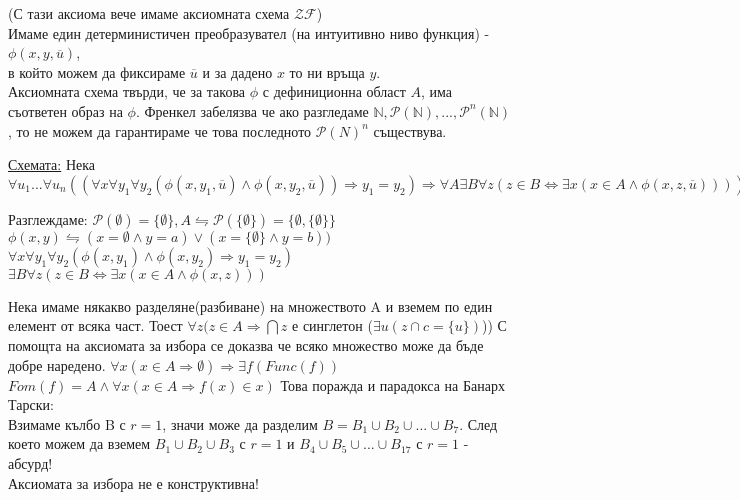 \documentclass[fleqn, titlepage, 12pt]{report}
\begin{document}
 (С тази аксиома вече имаме аксиомната схема $ \mathcal{ZF} $) \\
Имаме един детерминистичен преобразувател (на интуитивно ниво функция) - $ \phi(x,y,\overline{u})$,\\
в който можем да фиксираме $\overline{u}$ и за дадено $ x $ то ни връща $ y $.\\
Аксиомната схема твърди, че за такова $\phi$ с дефиниционна област $ A $, има съответен образ на $\phi$.
Френкел забелязва че ако разгледаме $ \mathbb{N}, \mathcal{P}( \mathbb{N}), ..., \mathcal{P}^n( \mathbb{N})  $,
то не можем да гарантираме че това последното $ \mathcal{P}(N)^n $ съществува.
\bigbreak

\underline{Схемата:} Нека
$\forall{u_1}... \forall{u_n} ((\forall{x} \forall{y_1} \forall{y_2}  (\phi(x,y_1,\overline{u})\land \phi(
x,y_2,\overline{u}
))
\Rightarrow y_1 = y_2) \Rightarrow \forall{A} \exists{B} \forall{z} (z \in B \Leftrightarrow \exists{x} (
x \in A \land \phi(x,z,\overline{u})
)))$
\bigbreak

Разглеждаме: $ \mathcal{P}(\emptyset) = \{ \emptyset\}, A \leftrightharpoons \mathcal{P}(
\{\emptyset\}) = \{ \emptyset, \{ \emptyset\}\} $\\
$ \phi(x,y) \leftrightharpoons (x = \emptyset \land y = a) \lor (x = \{ \emptyset\} \land y = b) )$\\
$ \forall{x} \forall{y_1} \forall{y_2} ( \phi(x,y_1) \land \phi(x,y_2) \Rightarrow  y_1 = y_2)$\\
$ \exists{B} \forall{z} (z \in B \Leftrightarrow \exists{x} (x \in A \land \phi(x,z)))$\\
\clearpage

 Нека имаме някакво разделяне(разбиване) на множеството A
и вземем по един елемент от всяка част. Тоест
$ \forall{z} (z \in A \Rightarrow  \bigcap z$ е синглетон ($ \exists{u} (z \cap c = \{ u\})$))
\bigbreak
С помощта на аксиомата за избора се доказва че всяко множество може да бъде добре наредено.
$ \forall{x} (x \in A \Rightarrow \emptyset) \Rightarrow \exists{f} (Func(f))$\\
$ Fom(f) = A \land \forall{x} (x \in A \Rightarrow f(x) \in x)$
\bigbreak
Това поражда и парадокса на Банарх Тарски:\\
Взимаме кълбо B с $r = 1$, значи може да разделим $B = B_1 \cup B_2 \cup ... \cup B_7$. След което можем да вземем
$B_1 \cup B_2 \cup B_3$ с $r = 1$ и $B_4 \cup B_5 \cup ... \cup B_17$ с $r = 1$ - абсурд!\\
Аксиомата за избора не е конструктивна!
\bigbreak
\end{document}
